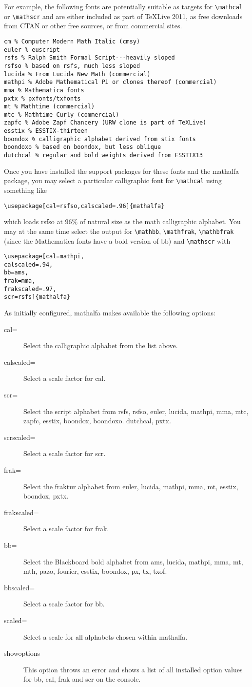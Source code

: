\documentclass[11pt]{amsart}
\begin{document}
For example, the following fonts are potentially suitable as  targets for \verb|\mathcal| or \verb|\mathscr| and are either included as part of \TeX Live 2011, as free downloads from CTAN or other free sources, or from commercial sites.
\begin{verbatim}
cm % Computer Modern Math Italic (cmsy)
euler % euscript
rsfs % Ralph Smith Formal Script---heavily sloped
rsfso % based on rsfs, much less sloped
lucida % From Lucida New Math (commercial)
mathpi % Adobe Mathematical Pi or clones thereof (commercial)
mma % Mathematica fonts
pxtx % pxfonts/txfonts
mt % Mathtime (commercial)
mtc % Mathtime Curly (commercial)
zapfc % Adobe Zapf Chancery (URW clone is part of TeXLive)
esstix % ESSTIX-thirteen
boondox % calligraphic alphabet derived from stix fonts
boondoxo % based on boondox, but less oblique
dutchcal % regular and bold weights derived from ESSTIX13
\end{verbatim}
Once you have installed the support packages for these fonts and the \textsf{mathalfa} package, you may select a particular calligraphic font for \verb|\mathcal| using something like
\begin{verbatim}
\usepackage[cal=rsfso,calscaled=.96]{mathalfa}
\end{verbatim}
which loads \textsf{rsfso} at 96\% of natural size as the math calligraphic alphabet. You may at the same time select the output for \verb|\mathbb|, \verb|\mathfrak|, \verb|\mathbfrak| (since the Mathematica fonts have a bold version of bb) and \verb|\mathscr| with
\begin{verbatim}
\usepackage[cal=mathpi,
calscaled=.94,
bb=ams,
frak=mma,
frakscaled=.97,
scr=rsfs]{mathalfa}
\end{verbatim}
As initially configured, \textsf{mathalfa} makes available the following options:
\begin{description}
\item[cal=] Select the calligraphic alphabet from the list above.
\item[calscaled=] Select a scale factor for \textsf{cal}.
\item[scr=] Select the script alphabet from \textsf{rsfs, rsfso, euler, lucida, mathpi, mma, mtc, zapfc, esstix, boondox, boondoxo. dutchcal, pxtx}.
\item[scrscaled=] Select a scale factor for \textsf{scr}.
\item[frak=] Select the fraktur alphabet from \textsf{euler, lucida, mathpi, mma, mt, esstix, boondox, pxtx}.
\item[frakscaled=] Select a scale factor for \textsf{frak}.
\item[bb=] Select the Blackboard bold alphabet from \textsf{ams, lucida, mathpi, mma, mt, mth, pazo, fourier, esstix, boondox, px, tx, txof}.
\item[bbscaled=] Select a scale factor for \textsf{bb}.
\item[scaled=] Select a scale for all alphabets chosen within mathalfa.
\item[showoptions] This option throws an error and shows a list of all installed option values for \textsf{bb}, \textsf{cal}, \textsf{frak} and \textsf{scr} on the console.
\end{description}
\end{document}
